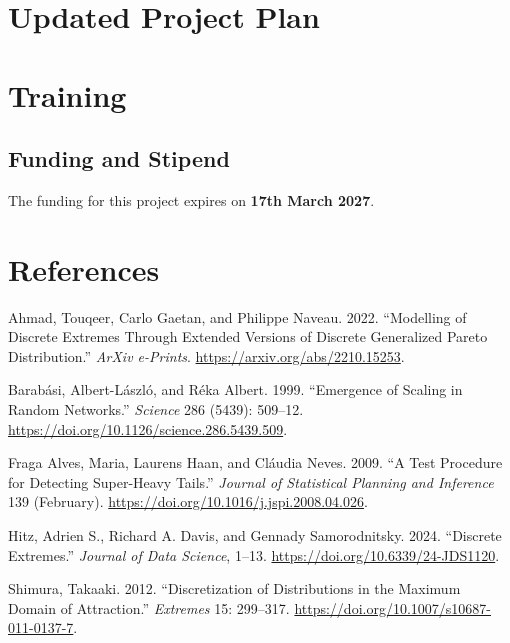 \documentclass[
  10pt,
  a4paper,
]{scrreprt}
\newlength{\cslhangindent}
\newlength{\cslentryspacingunit} %
\newenvironment{CSLReferences}[2] %
 {%
  \setlength{\parindent}{0pt}
  \ifodd #1
  \let\oldpar\par
  \def\par{\hangindent=\cslhangindent\oldpar}
  \fi
  \setlength{\parskip}{#2\cslentryspacingunit}
 }%
 {}
\theoremstyle{plain}
\theoremstyle{plain}
\theoremstyle{plain}
\theoremstyle{definition}
\theoremstyle{remark}
\begin{document}
{\appendix

\hypertarget{updated-project-plan}{%
\chapter{Updated Project Plan}\label{updated-project-plan}}

\hypertarget{training}{%
\chapter{Training}\label{training}}

\hypertarget{funding-and-stipend}{%
\section*{Funding and Stipend}\label{funding-and-stipend}}

The funding for this project expires on \textbf{17th March 2027}.

\hypertarget{references}{%
\chapter*{References}\label{references}}

\hypertarget{refs}{}
\begin{CSLReferences}{1}{0}
\leavevmode{}%
Ahmad, Touqeer, Carlo Gaetan, and Philippe Naveau. 2022. {``Modelling of
Discrete Extremes Through Extended Versions of Discrete Generalized
Pareto Distribution.''} \emph{ArXiv e-Prints}.
\url{https://arxiv.org/abs/2210.15253}.

\leavevmode{}%
Barabási, Albert-László, and Réka Albert. 1999. {``Emergence of Scaling
in Random Networks.''} \emph{Science} 286 (5439): 509--12.
\url{https://doi.org/10.1126/science.286.5439.509}.

\leavevmode{}%
Fraga Alves, Maria, Laurens Haan, and Cláudia Neves. 2009. {``A Test
Procedure for Detecting Super-Heavy Tails.''} \emph{Journal of
Statistical Planning and Inference} 139 (February).
\url{https://doi.org/10.1016/j.jspi.2008.04.026}.

\leavevmode{}%
Hitz, Adrien S., Richard A. Davis, and Gennady Samorodnitsky. 2024.
{``Discrete Extremes.''} \emph{Journal of Data Science}, 1--13.
\url{https://doi.org/10.6339/24-JDS1120}.

\leavevmode{}%
Shimura, Takaaki. 2012. {``Discretization of Distributions in the
Maximum Domain of Attraction.''} \emph{Extremes} 15: 299--317.
\url{https://doi.org/10.1007/s10687-011-0137-7}.

\end{CSLReferences}
\end{document}
